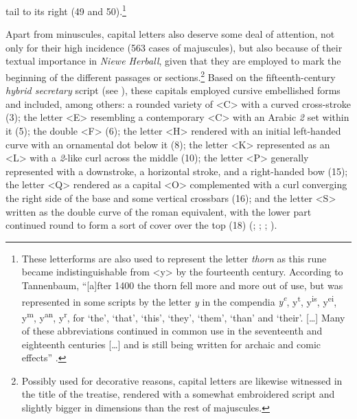 \documentclass{article}
\begin{document}
tail to its right (49 and 50).\footnote{These letterforms are also used
  to represent the letter \emph{thorn} as this rune became
  indistinguishable from \textless y\textgreater{} by the fourteenth
  century. According to Tannenbaum, ``{[}a{]}fter 1400 the thorn fell
  more and more out of use, but was represented in some scripts by the
  letter \emph{y} in the compendia \emph{y\textsuperscript{e}},
  y\textsuperscript{t}, y\textsuperscript{is}, y\textsuperscript{ei},
  y\textsuperscript{m}, y\textsuperscript{an}, y\textsuperscript{r}, for
  `the', `that', `this', `they', `them', `than' and `their'.
  {[}\ldots{]} Many of these abbreviations continued in common use in
  the seventeenth and eighteenth centuries {[}\ldots{]} and is still
  being written for archaic and comic effects'' \citep[88]{tannenbaum_handwriting_1930}.}

Apart from minuscules, capital letters also deserve some deal of
attention, not only for their high incidence (563 cases of majuscules),
but also because of their textual importance in \emph{Niewe Herball},
given that they are employed to mark the beginning of the different
passages or sections.\footnote{Possibly used for decorative reasons,
  capital letters are likewise witnessed in the title of the treatise,
  rendered with a somewhat embroidered script and slightly bigger in
  dimensions than the rest of majuscules.} Based on the
fifteenth-century \emph{hybrid secretary} script (see \cite[17--18]{petti_english_1977}), these capitals employed cursive embellished forms and included,
among others: a rounded variety of
\textless C\textgreater{} with a curved cross-stroke (3); the letter
\textless E\textgreater{} resembling a contemporary
\textless C\textgreater{} with an Arabic \emph{2} set within it (5); the
double \textless F\textgreater{} (6); the letter
\textless H\textgreater{} rendered with an initial left-handed curve
with an ornamental dot below it (8); the letter
\textless K\textgreater{} represented as an \textless L\textgreater{}
with a \emph{2}-like curl across the middle (10); the letter
\textless P\textgreater{} generally represented with a downstroke, a
horizontal stroke, and a right-handed bow (15); the letter
\textless Q\textgreater{} rendered as a capital
\textless O\textgreater{} complemented with a curl converging the right
side of the base and some vertical crossbars (16); and the letter
\textless S\textgreater{} written as the double curve of the roman
equivalent, with the lower part continued round to form a sort of cover
over the top (18) (\cite[31--36]{mckerrow_capital_1927}; \cite[95--118]{tannenbaum_handwriting_1930};
\cite[13--16]{dawson_elizabethan_1966}; \cite[17--18]{petti_english_1977}).
\end{document}
